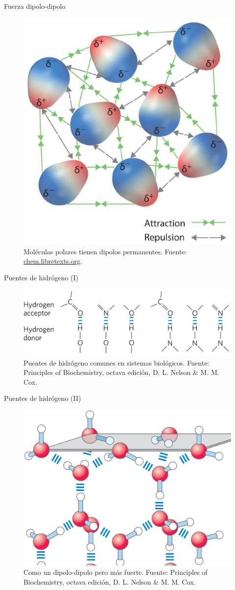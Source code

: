 \documentclass{beamer}
\begin{document}
\begin{frame}{Fuerza dipolo-dipolo}
  \begin{figure}
    \centering
    \includegraphics[width=0.55\linewidth]{imgs/dipole-dipole}
    \caption{Moléculas polares tienen dipolos permanentes. Fuente: \href{https://chem.libretexts.org/Courses/Riverland_Community_College}{chem.libretexts.org}.}
    \label{fig:dipoledipole}
  \end{figure}
\end{frame}
\begin{frame}{Puentes de hidrógeno (I)}
  \begin{figure}
    \centering
    \includegraphics[width=0.7\linewidth]{imgs/hbond-01}
    \caption{Puentes de hidrógeno comunes en sistemas biológicos. Fuente: Principles of Biochemistry, octava edición, D. L. Nelson \& M. M. Cox.}
    \label{fig:hbond-01}
  \end{figure}
\end{frame}
\begin{frame}{Puentes de hidrógeno (II)}
  \begin{figure}
    \centering
    \includegraphics[width=0.7\linewidth]{imgs/hbond}
    \caption{Como un dipolo-dipolo pero más fuerte. Fuente: Principles of Biochemistry, octava edición, D. L. Nelson \& M. M. Cox.}
    \label{fig:hbond}
  \end{figure}
\end{frame}
\end{document}
